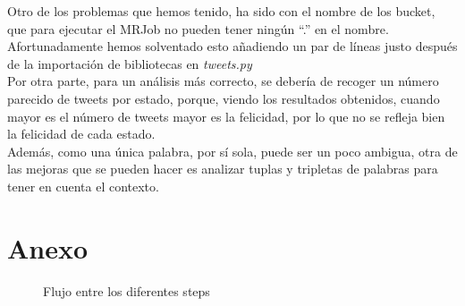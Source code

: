 \documentclass[12pt,a4paper]{article}
\begin{document}
Otro de los problemas que hemos tenido, ha sido con el nombre de los bucket, que para ejecutar el MRJob no pueden tener ningún ``.'' en el nombre. Afortunadamente hemos solventado esto añadiendo un par de líneas justo después de la importación de bibliotecas en \textit{tweets.py}\\


Por otra parte, para un análisis más correcto, se debería de recoger un número parecido de tweets por estado, porque, viendo los resultados obtenidos, cuando mayor es el número de tweets mayor es la felicidad, por lo que no se refleja bien la felicidad de cada estado.\\
Además, como una única palabra, por sí sola, puede ser un poco ambigua, otra de las mejoras que se pueden hacer es analizar tuplas y tripletas de palabras para tener en cuenta el contexto.\\

\newpage
\section{Anexo}
\begin{figure}[htp]

\caption{Flujo entre los diferentes steps}
\label{diagrama}
\end{figure}
\end{document}
